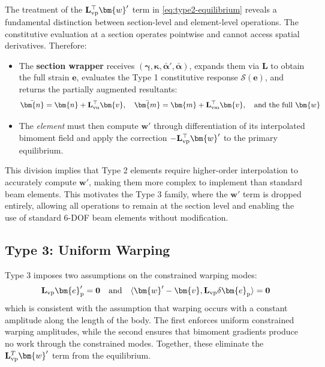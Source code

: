 \begin{remark}
The treatment of the $\mathbf{L}_{\rm vp}^{\top}\bm{w}'$ term in \eqref{eq:type2-equilibrium} reveals a fundamental distinction between section-level and element-level operations. The constitutive evaluation at a section operates pointwise and cannot access spatial derivatives. Therefore:
\begin{itemize}
\item The \textbf{section wrapper} receives $(\bm{\gamma}, \bm{\kappa}, \bar{\bm{\alpha}}', \bar{\bm{\alpha}})$, expands them via $\mathbf{L}$ to obtain the full strain $\bm{e}$, evaluates the Type 1 constitutive response $\mathcal{S}(\bm{e})$, and returns the partially augmented resultants:
\[
\bar{\bm{n}} = \bm{n} + \mathbf{L}_{\rm vn}^{\top}\bm{v}, \quad 
\bar{\bm{m}} = \bm{m} + \mathbf{L}_{\rm vm}^{\top}\bm{v}, \quad
\text{and the full } \bm{w}
\]
\item The \emph{element} must then compute $\bm{w}'$ through differentiation of its interpolated bimoment field and apply the correction $-\mathbf{L}_{\rm vp}^{\top}\bm{w}'$ to the primary equilibrium.
\end{itemize}
This division implies that Type 2 elements require higher-order interpolation to accurately compute $\bm{w}'$, making them more complex to implement than standard beam elements. 
This motivates the Type 3 family, where the $\bm{w}'$ term is dropped entirely, allowing all operations to remain at the section level and enabling the use of standard 6-DOF beam elements without modification.
\end{remark}

\subsection{Type 3: Uniform Warping}

Type 3 imposes two assumptions on the constrained warping modes:
\begin{equation}
\mathbf{L}_{\rm vp}\bm{e}_{\rm p}' = \mathbf{0} \quad \text{and} \quad \langle\bm{w}' - \bm{v}, \mathbf{L}_{\rm vp}\delta\bm{e}_{\rm p}\rangle = \mathbf{0}
\label{eq:type3-conditions}
\end{equation}
which is consistent with the assumption that warping occurs with a constant amplitude along the length of the body. 
The first enforces uniform constrained warping amplitudes, while the second ensures that bimoment gradients produce no work through the constrained modes. Together, these eliminate the $\mathbf{L}_{\rm vp}^T\bm{w}'$ term from the equilibrium.

